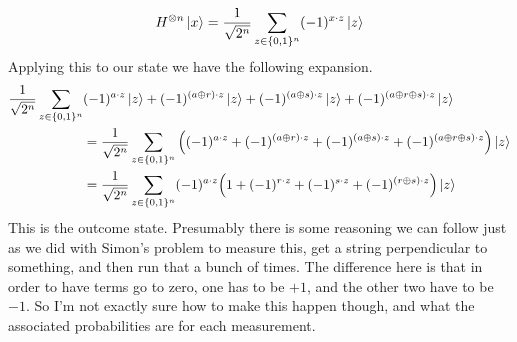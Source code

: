 \documentclass[boxes,pages]{homework}
\begin{document}
\begin{solution}
	\begin{equation*}
		H^{\otimes n}\ket{x} = \frac{1}{\sqrt{2^n}}\sum_{z\in\{0, 1\}^n}(-1)^{x\cdot z}\ket{z}
	\end{equation*}
	Applying this to our state we have the following expansion.
	\begin{align*}
		\frac{1}{\sqrt{2^n}}\sum_{z\in\{0, 1\}^n} & (-1)^{a\cdot z}\ket{z} + (-1)^{(a\oplus r)\cdot z}\ket{z} + (-1)^{(a\oplus s)\cdot z}\ket{z} + (-1)^{(a\oplus r \oplus s)\cdot z}\ket{z}                             \\
		                                          & = \frac{1}{\sqrt{2^n}}\sum_{z\in\{0, 1\}^n}\qty((-1)^{a\cdot z} + (-1)^{(a\oplus r)\cdot z} + (-1)^{(a\oplus s)\cdot z} + (-1)^{(a\oplus r \oplus s)\cdot z})\ket{z} \\
		                                          & = \frac{1}{\sqrt{2^n}}\sum_{z\in\{0, 1\}^n}(-1)^{a\cdot z}\qty(1 + (-1)^{r\cdot z} + (-1)^{s\cdot z} + (-1)^{(r\oplus s)\cdot z})\ket{z}                             \\
	\end{align*}
	This is the outcome state. Presumably there is some reasoning we can follow just as we did with Simon's problem to measure this, get a string perpendicular to something, and then run that a bunch of times. The difference here is that in order to have terms go to zero, one has to be $+1$, and the other two have to be $-1$. So I'm not exactly sure how to make this happen though, and what the associated probabilities are for each measurement.
\end{solution}
\end{document}
